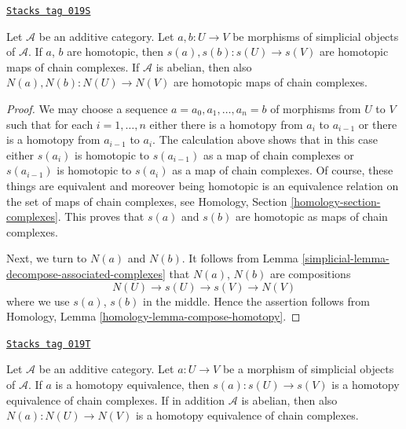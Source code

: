 \begin{lemma}[Homotopy s N]
\label{simplicial-lemma-homotopy-s-N}
\href{https://stacks.math.columbia.edu/tag/019S}{\texttt{Stacks tag 019S}}

Let $\mathcal{A}$ be an additive category. Let $a, b : U \to V$ be morphisms
of simplicial objects of $\mathcal{A}$. If $a$, $b$ are homotopic,
then $s(a), s(b) : s(U) \to s(V)$ are homotopic maps of chain complexes.
If $\mathcal{A}$ is abelian, then also $N(a), N(b) : N(U) \to N(V)$ are
homotopic maps of chain complexes.
\end{lemma}

\begin{proof}

We may choose a sequence $a = a_0, a_1, \ldots, a_n = b$ of morphisms from
$U$ to $V$ such that for each $i = 1, \ldots, n$ either there is a
homotopy from $a_i$ to $a_{i - 1}$ or there is a
homotopy from $a_{i - 1}$ to $a_i$. The calculation above
shows that in this case either
$s(a_i)$ is homotopic to $s(a_{i - 1})$ as a map of chain complexes
or $s(a_{i - 1})$ is homotopic to $s(a_i)$ as a map of chain complexes.
Of course, these things are equivalent and moreover being homotopic
is an equivalence relation on the set of maps of chain complexes, see
Homology, Section \ref{homology-section-complexes}.
This proves that $s(a)$ and $s(b)$ are homotopic as maps
of chain complexes.

\medskip\noindent
Next, we turn to $N(a)$ and $N(b)$. It follows from
Lemma \ref{simplicial-lemma-decompose-associated-complexes} that
$N(a)$, $N(b)$ are compositions
$$
N(U) \to s(U) \to s(V) \to N(V)
$$
where we use $s(a)$, $s(b)$ in the middle. Hence the assertion
follows from
Homology, Lemma \ref{homology-lemma-compose-homotopy}.
\end{proof}

\begin{lemma}
\label{simplicial-lemma-homotopy-equivalence-s-N}
\href{https://stacks.math.columbia.edu/tag/019T}{\texttt{Stacks tag 019T}}

Let $\mathcal{A}$ be an additive category. Let $a : U \to V$ be a morphism
of simplicial objects of $\mathcal{A}$. If $a$ is a homotopy equivalence,
then $s(a) : s(U) \to s(V)$ is a homotopy equivalence of chain complexes.
If in addition $\mathcal{A}$ is abelian, then also
$N(a) : N(U) \to N(V)$ is a homotopy equivalence of chain complexes.
\end{lemma}

